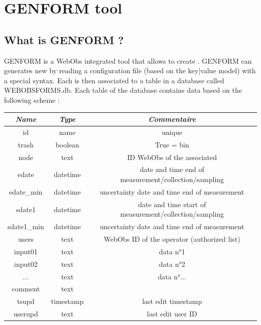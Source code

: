 
\chapter{GENFORM tool} \label{metadata}



\section{What is GENFORM ?} \label{genform}

GENFORM is a WebObs integrated tool that allows to create . GENFORM can generates new  by reading a configuration file (based on the key|value model) with a special syntax. Each  is then associated to a table in a database called WEBOBSFORMS.db. Each table of the database contains data based on the following scheme :

\begin{center}
	\begin{tabular}{c c c}
		\hline
		\textit{Name} & \textit{Type} & \textit{Commentaire} \\
		\hline
		id & name & unique \\
		trash & boolean & True = bin	\\
		node & text & ID WebObs of the associated \wo{node} \\
		edate & datetime & date and time end of measurement/collection/sampling \\
		edate\_min & datetime & uncertainty date and time end of measurement \\
		sdate1 & datetime & date and time start of measurement/collection/sampling \\
		sdate1\_min & datetime & uncertainty date and time end of measurement \\
		users & text & WebObs ID of the operator (authorized list) \\
		input01 & text & data n°1 \\
		input02 & text & data n°2 \\
		... & text & data n°... \\
		comment & text \\
		tsupd & timestamp & last edit timestamp \\
		userupd & text & last edit user ID \\
		\hline
	\end{tabular}
\end{center}

